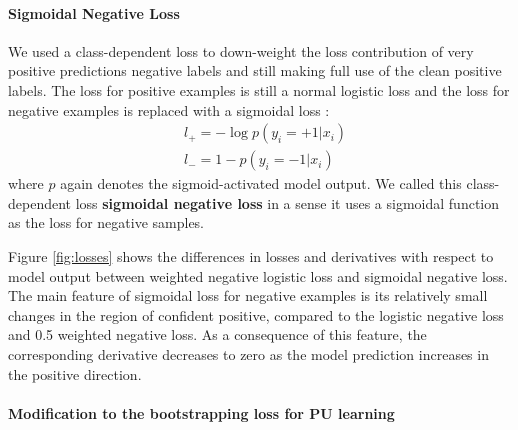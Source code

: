 \paragraph{Sigmoidal Negative Loss}

We used a class-dependent loss to down-weight the loss contribution of very positive predictions negative labels and still making full use of the clean positive labels.
The loss for positive examples is still a normal logistic loss and the loss for negative examples is replaced with a sigmoidal loss \cite{tax2016class}:
\begin{equation*}
  \begin{aligned}
    & l_{+} = - \log p(y_i=+1 \vert x_i) \\
    & l_{-} = 1 - p(y_i=-1|x_i)
  \end{aligned}
\end{equation*}
where $p$ again denotes the sigmoid-activated model output.
We called this class-dependent loss \textbf{sigmoidal negative loss} in a sense it uses a sigmoidal function as the loss for negative samples.

Figure \ref{fig:losses} shows the differences in losses and derivatives with respect to model output between weighted negative logistic loss and sigmoidal negative loss.
The main feature of sigmoidal loss for negative examples is its relatively small changes in the region of confident positive, compared to the logistic negative loss and 0.5 weighted negative loss.
As a consequence of this feature, the corresponding derivative decreases to zero as the model prediction increases in the positive direction.


\paragraph{Modification to the bootstrapping loss for PU learning}


